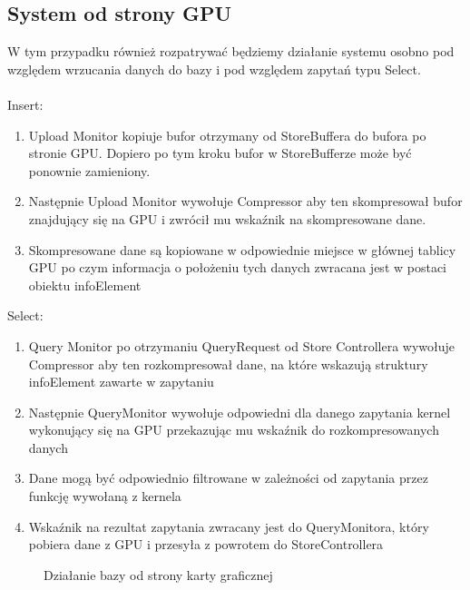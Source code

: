 \documentclass[paper=a4, fontsize=11pt]{scrartcl} %
\numberwithin{equation}{section} %
\numberwithin{figure}{section} %
\numberwithin{table}{section} %
\begin{document}
	\subsection{System od strony GPU}
		W tym przypadku również rozpatrywać będziemy działanie systemu osobno pod względem wrzucania danych do bazy i pod względem zapytań typu Select. \\ \\
		Insert: \\
		\begin{enumerate}
			\item Upload Monitor kopiuje bufor otrzymany od StoreBuffera do bufora po stronie GPU. Dopiero po tym kroku bufor w StoreBufferze może być ponownie zamieniony.
			\item Następnie Upload Monitor wywołuje Compressor aby ten skompresował bufor znajdujący się na GPU i zwrócił mu wskaźnik na skompresowane dane.
			\item Skompresowane dane są kopiowane w odpowiednie miejsce w głównej tablicy GPU po czym informacja o położeniu tych danych zwracana jest w postaci 
				obiektu infoElement
		\end{enumerate}
		Select: \\
		\begin{enumerate}
			\item Query Monitor po otrzymaniu QueryRequest od Store Controllera wywołuje Compressor aby ten rozkompresował dane, na które wskazują struktury infoElement zawarte w zapytaniu
			\item Następnie QueryMonitor wywołuje odpowiedni dla danego zapytania kernel wykonujący się na GPU przekazując mu wskaźnik do rozkompresowanych danych 
			\item Dane mogą być odpowiednio filtrowane w zależności od zapytania przez funkcję wywołaną z kernela
			\item Wskaźnik na rezultat zapytania zwracany jest do QueryMonitora, który pobiera dane z GPU i przesyła z powrotem do StoreControllera
		\end{enumerate}
		\begin{figure}[t]
			\begin{center}
				\caption{Działanie bazy od strony karty graficznej}
			\end{center}
		\end{figure}
\end{document}
